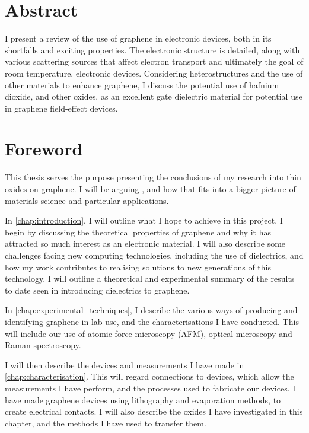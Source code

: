 \documentclass{report}
\begin{document}
	
	\newcommand{\chapterNoNum}[1]{
		\chapter*{#1}
		\addcontentsline{toc}{chapter}{#1}
	}
	
	\chapterNoNum{Abstract}
	I present a review of the use of graphene in electronic devices, both in its shortfalls and exciting properties. The electronic structure is detailed, along with various scattering sources that affect electron transport and ultimately the goal of room temperature, electronic devices. Considering heterostructures and the use of other materials to enhance graphene, I discuss the potential use of hafnium dioxide, and other oxides, as an excellent gate dielectric material for potential use in graphene field-effect devices.
		
	\renewcommand{\baselinestretch}{0.94}\normalsize
	\tableofcontents
	\renewcommand{\baselinestretch}{1}\normalsize
	
	
	\chapterNoNum{Foreword}
	This thesis serves the purpose presenting the conclusions of my research into thin oxides on graphene. I will be arguing {}, and how that fits into a bigger picture of materials science and particular applications. %
	
	In \cref{chap:introduction}, I will outline what I hope to achieve in this project. I begin by discussing the theoretical properties of graphene and why it has attracted so much interest as an electronic material. I will also describe some challenges facing new computing technologies, including the use of dielectrics, and how my work contributes to realising solutions to new generations of this technology. I will outline a theoretical and experimental summary of the results to date seen in introducing dielectrics to graphene.
	
	In \cref{chap:experimental_techniques}, I describe the various ways of producing and identifying graphene in lab use, and the characterisations I have conducted. This will include our use of atomic force microscopy (AFM), optical microscopy and Raman spectroscopy.
	
	I will then describe the devices and measurements I have made in \cref{chap:characterisation}. This will regard connections to devices, which allow the measurements I have perform, and the processes used to fabricate our devices. I have made graphene devices using lithography and evaporation methods, to create electrical contacts. I will also describe the oxides I have investigated in this chapter, and the methods I have used to transfer them.
	
\end{document}
